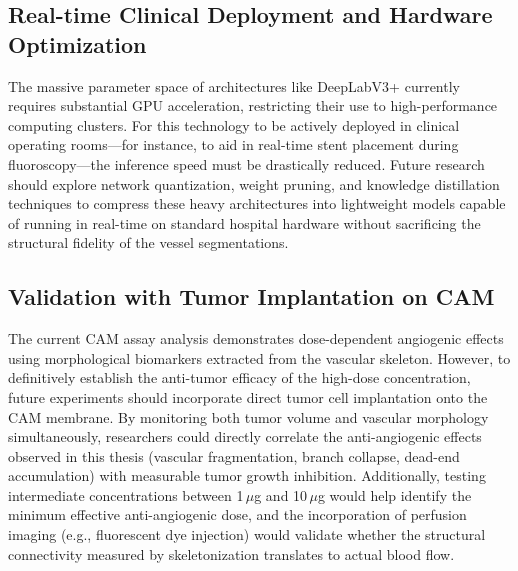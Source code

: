 \subsection{Real-time Clinical Deployment and Hardware Optimization}
The massive parameter space of architectures like DeepLabV3+ currently requires substantial GPU acceleration, restricting their use to high-performance computing clusters. For this technology to be actively deployed in clinical operating rooms---for instance, to aid in real-time stent placement during fluoroscopy---the inference speed must be drastically reduced. Future research should explore network quantization, weight pruning, and knowledge distillation techniques to compress these heavy architectures into lightweight models capable of running in real-time on standard hospital hardware without sacrificing the structural fidelity of the vessel segmentations.

\subsection{Validation with Tumor Implantation on CAM}
The current CAM assay analysis demonstrates dose-dependent angiogenic effects using morphological biomarkers extracted from the vascular skeleton. However, to definitively establish the anti-tumor efficacy of the high-dose concentration, future experiments should incorporate direct tumor cell implantation onto the CAM membrane. By monitoring both tumor volume and vascular morphology simultaneously, researchers could directly correlate the anti-angiogenic effects observed in this thesis (vascular fragmentation, branch collapse, dead-end accumulation) with measurable tumor growth inhibition. Additionally, testing intermediate concentrations between 1\,$\mu$g and 10\,$\mu$g would help identify the minimum effective anti-angiogenic dose, and the incorporation of perfusion imaging (e.g., fluorescent dye injection) would validate whether the structural connectivity measured by skeletonization translates to actual blood flow.
